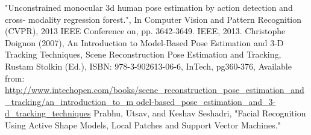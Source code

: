 \documentclass[a4paper, 12pt]{article}
\begin{document}
\begin{thebibliography}{9}
	"Unconstrained monocular 3d human pose estimation by action detection and cross-			modality regression forest.",
	In Computer Vision and Pattern Recognition (CVPR),
	2013 IEEE Conference on, pp. 3642-3649. IEEE, 2013.
%
Christophe Doignon (2007),
An Introduction to Model-Based Pose Estimation and 3-D Tracking Techniques,
Scene Reconstruction Pose Estimation and Tracking, Rustam Stolkin (Ed.), ISBN: 978-3-902613-06-6, InTech, pg360-376,
Available from:
\url{http://www.intechopen.com/books/scene_reconstruction_pose_estimation_and_tracking/an_introduction_to_m
odel-based_pose_estimation_and_3-d_tracking_techniques}
%
Prabhu, Utsav, and Keshav Seshadri,
"Facial Recognition Using Active Shape Models, Local Patches and Support Vector Machines."
%
\end{thebibliography}
\clearpage
\end{document}
